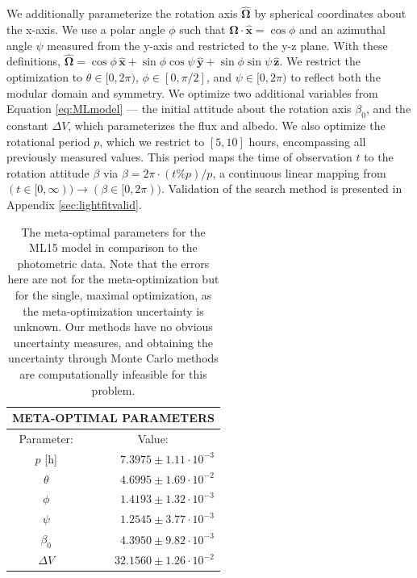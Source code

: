 \documentclass[twocolumn,doublespacing]{aastex631}
\begin{document}
We additionally parameterize the rotation axis $\boldsymbol{\hat{\Omega}}$ by spherical coordinates about the x-axis. We use a polar angle $\phi$ such that $\boldsymbol{\hat{\Omega}}\cdot\boldsymbol{\hat{x}}=\cos\phi$ and an azimuthal angle $\psi$ measured from the y-axis and restricted to the y-z plane. With these definitions, $\boldsymbol{\hat{\Omega}}=\cos\phi\,\boldsymbol{\hat{x}}+\sin\phi\cos\psi\,\boldsymbol{\hat{y}}+\sin\phi\sin\psi\,\boldsymbol{\hat{z}}$. We restrict the optimization to $\theta\in[0,2\pi)$, $\phi\in[0,\pi/2]$, and $\psi\in[0,2\pi)$ to reflect both the modular domain and symmetry. We optimize two additional variables from Equation \ref{eq:MLmodel} --- the initial attitude about the rotation axis $\beta_0$, and the constant $\Delta V$, which parameterizes the flux and albedo. We also optimize the rotational period $p$, which we restrict to $[5,10]$ hours, encompassing all previously measured values. This period maps the time of observation $t$ to the rotation attitude $\beta$ via $\beta=2\pi\cdot(t\%p)/p$, a continuous linear mapping from $(t\in[0,\infty))\rightarrow(\beta\in[0,2\pi))$. Validation of the search method is presented in Appendix \ref{sec:lightfitvalid}.

\begin{table}[ht]
\begin{tabular}{ |c|r| } 
 \hline
 \multicolumn{2}{||c||}{META-OPTIMAL PARAMETERS} \\
 \hline\hline
 Parameter: & \multicolumn{1}{c|}{Value:} \\ 
 \hline
 $p$ [h] & $7.3975\pm1.11\cdot10^{-3}$ \\
 \hline
 $\theta$ & $4.6995\pm1.69\cdot10^{-2}$ \\
 \hline
 $\phi$ & $1.4193\pm1.32\cdot10^{-3}$ \\
 \hline
 $\psi$ & $1.2545\pm3.77\cdot10^{-3}$ \\
 \hline
 $\beta_0$ & $4.3950\pm9.82\cdot10^{-3}$ \\
 \hline
 $\Delta V$ & $32.1560\pm1.26\cdot10^{-2}$ \\
 \hline
\end{tabular}
\caption{The meta-optimal parameters for the ML15 model in comparison to the photometric data. Note that the errors here are not for the meta-optimization but for the single, maximal optimization, as the meta-optimization uncertainty is unknown. Our methods have no obvious uncertainty measures, and obtaining the uncertainty through Monte Carlo methods are computationally infeasible for this problem.}
\label{table:optimalparams}
\end{table}
\end{document}
